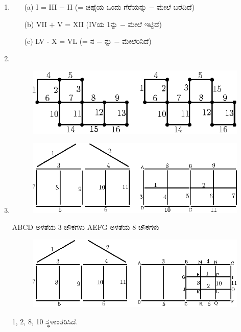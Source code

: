 \begin{enumerate}
\vskip 0.3cm

\item 
\begin{itemize}
\item[(a)] I = III $-$ II (= ಚಿಹ್ನೆಯ ಒಂದು ಗೆರೆಯನ್ನು $-$ ಮೇಲೆ ಬರೆದಿದೆ)
\item[(b)] VII $+$ V = XII (IVಯ 1ನ್ನು $-$ ಮೇಲೆ ಇಟ್ಟಿದೆ)
\item[(c)] LV - X = VL (= ನ $-$ ನ್ನು $-$ ಮೇಲೆರಿನಿದೆ)
\end{itemize}

\eject

\item 
~

\begin{figure}[H]
\centering
\includegraphics{images/chap9/ans10.eps}
\end{figure}

\item 
\begin{figure}[H]
\centering
\includegraphics{images/chap9/ans11a.eps}
\end{figure}
ABCD ಅಳತೆಯ 3 ಚೌಕಗಳು AEFG ಅಳತೆಯ 8 ಚೌಕಗಳು 

\begin{figure}[H]
\centering
\includegraphics{images/chap9/ans11b.eps}
\end{figure}
1, 2, 8, 10 ಸ್ಥಳಾಂತರಿಸಿದೆ. 


\end{enumerate}
